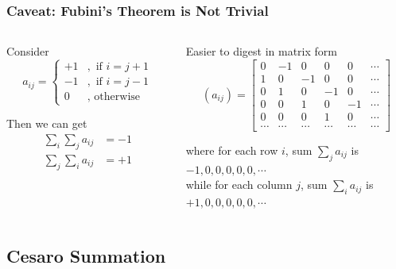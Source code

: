 \documentclass{beamer}
\begin{document}
\begin{frame}
\frametitle{Caveat: Fubini's Theorem is Not Trivial}
\begin{columns}[c] %

\begin{column}{0.4\textwidth} %

Consider 
$$ a_{ij} = \begin{cases}
  +1 &, \text{ if } i = j + 1 \\ 
  -1 &, \text{ if } i = j - 1 \\ 
   0 &, \text{ otherwise}  
\end{cases} $$

Then we can get 
\begin{align*}
    \sum_{i} \sum_{j} a_{ij} &= -1 \\ 
    \sum_{j} \sum_{i} a_{ij} &= +1
\end{align*}

\end{column}
\begin{column}{0.6\textwidth} %

Easier to digest in matrix form
$$ (a_{ij}) = \begin{bmatrix}
     0 & -1 &  0 &  0 &  0 & \cdots \\ 
     1 &  0 & -1 &  0 &  0 & \cdots \\ 
     0 &  1 &  0 & -1 &  0 & \cdots \\ 
     0 &  0 &  1 &  0 & -1 & \cdots \\ 
     0 &  0 &  0 &  1 &  0 & \cdots \\ 
    \cdots & \cdots & \cdots & \cdots & \cdots & \cdots 
\end{bmatrix}$$

where for each row $i$, sum $ \sum_{j} a_{ij} $ is \\ 
\qquad $ -1, 0, 0, 0, 0, 0, \cdots $ \\ 
while for each column $j$, sum $ \sum_{i} a_{ij} $ is \\ 
\qquad $ +1, 0, 0, 0, 0, 0, \cdots $

\end{column}
\end{columns}
\end{frame}


\subsection{Cesaro Summation}
\end{document}
